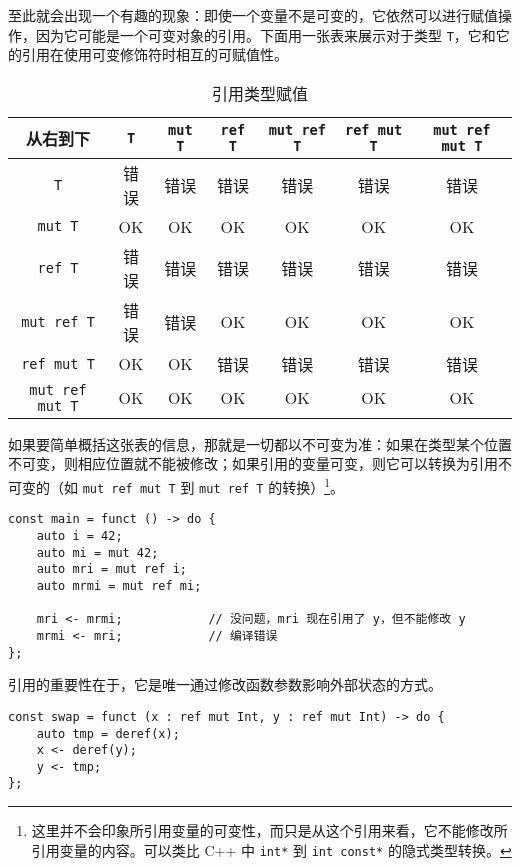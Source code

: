 至此就会出现一个有趣的现象：即使一个变量不是可变的，它依然可以进行赋值操作，因为它可能是一个可变对象的引用。下面用一张表来展示对于类型 \lstinline!T!，它和它的引用在使用可变修饰符时相互的可赋值性。

\begin{table}[h]
    \centering
    \begin{tabular}{|c|c|c|c|c|c|c|} \hline
        从右到下             & \lstinline!T! & \lstinline!mut T! & \lstinline!ref T! & \lstinline!mut ref T! & \lstinline!ref mut T!  & \lstinline!mut ref mut T!  \\\hline
        \lstinline!T!       & 错误 & 错误 & 错误 & 错误 & 错误 & 错误 \\\hline
        \lstinline!mut T!   & OK & OK & OK & OK & OK & OK \\\hline
        \lstinline!ref T!   & 错误 & 错误 & 错误 & 错误 & 错误 & 错误 \\\hline
        \lstinline!mut ref T!  & 错误 & 错误 & OK & OK & OK & OK \\\hline
        \lstinline!ref mut T!  & OK & OK & 错误 & 错误 & 错误 & 错误 \\\hline
        \lstinline!mut ref mut T! & OK & OK & OK & OK & OK & OK \\\hline
    \end{tabular}
    \caption{引用类型赋值}
    \label{tab:reference-constness}
\end{table}

如果要简单概括这张表的信息，那就是一切都以不可变为准：如果在类型某个位置不可变，则相应位置就不能被修改；如果引用的变量可变，则它可以转换为引用不可变的（如 \lstinline!mut ref mut T! 到 \lstinline!mut ref T! 的转换）\footnote{这里并不会印象所引用变量的可变性，而只是从这个引用来看，它不能修改所引用变量的内容。可以类比 C++ 中 \lstinline!int*! 到 \lstinline!int const*! 的隐式类型转换。}。

\begin{lstlisting}
const main = funct () -> do {
    auto i = 42;
    auto mi = mut 42;
    auto mri = mut ref i;
    auto mrmi = mut ref mi;

    mri <- mrmi;            // 没问题，mri 现在引用了 y，但不能修改 y
    mrmi <- mri;            // 编译错误
};
\end{lstlisting}

引用的重要性在于，它是唯一通过修改函数参数影响外部状态的方式。

\begin{lstlisting}
const swap = funct (x : ref mut Int, y : ref mut Int) -> do {
    auto tmp = deref(x);
    x <- deref(y);
    y <- tmp;
};
\end{lstlisting}

